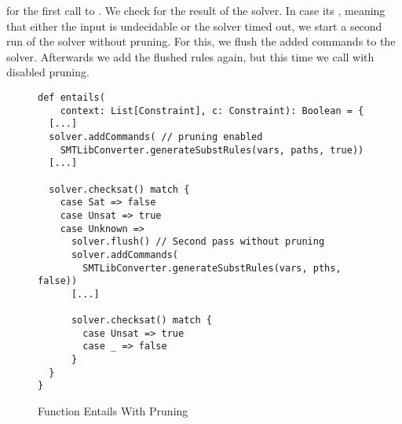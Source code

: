 for the first call to .
We check for the result of the solver.
In case its ,
meaning that either the input is undecidable or
the solver timed out,
we start a second run of the solver without pruning.
For this, we flush the added commands to the solver.
Afterwards we add the flushed rules again,
but this time we call  with disabled pruning.
%
\begin{figure}[t]
\begin{lstlisting}
def entails(
    context: List[Constraint], c: Constraint): Boolean = {
  [...]
  solver.addCommands( // pruning enabled
    SMTLibConverter.generateSubstRules(vars, paths, true))
  [...]

  solver.checksat() match {
    case Sat => false
    case Unsat => true
    case Unknown =>
      solver.flush() // Second pass without pruning
      solver.addCommands(
        SMTLibConverter.generateSubstRules(vars, pths, false))
      [...]

      solver.checksat() match {
        case Unsat => true
        case _ => false
      }
  }
}
\end{lstlisting}
\caption{Function Entails With Pruning}
\label{fig:scala-entails-twopass}
\end{figure}



